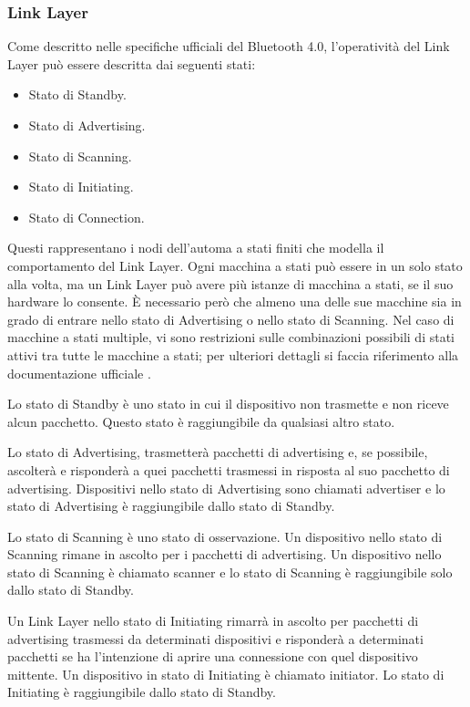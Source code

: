 \subsubsection{Link Layer}
Come descritto nelle specifiche ufficiali del Bluetooth 4.0\cite{BT-CoreSpec4.0}, l'operatività del Link Layer può essere descritta dai seguenti stati:
\begin{itemize}
	\item Stato di Standby.
	\item Stato di Advertising.
	\item Stato di Scanning.
	\item Stato di Initiating.
	\item Stato di Connection.
\end{itemize}
Questi rappresentano i nodi dell'automa a stati finiti che modella il comportamento del Link Layer. Ogni macchina a stati può essere in un solo stato alla volta, ma un Link Layer può avere più istanze di macchina a stati, se il suo hardware lo consente. È necessario però che almeno una delle sue macchine sia in grado di entrare nello stato di Advertising o nello stato di Scanning. Nel caso di macchine a stati multiple, vi sono restrizioni sulle combinazioni possibili di stati attivi tra tutte le macchine a stati; per ulteriori dettagli si faccia riferimento alla documentazione ufficiale \cite{BT-CoreSpec4.0}.\medskip

Lo stato di Standby è uno stato in cui il dispositivo non trasmette e non riceve alcun pacchetto. Questo stato è raggiungibile da qualsiasi altro stato.\medskip

Lo stato di Advertising, trasmetterà pacchetti di advertising e, se possibile, ascolterà e risponderà a quei pacchetti trasmessi in risposta al suo pacchetto di advertising. Dispositivi nello stato di Advertising sono chiamati advertiser e lo stato di Advertising è raggiungibile dallo stato di Standby.\medskip

Lo stato di Scanning è uno stato di osservazione. Un dispositivo nello stato di Scanning rimane in ascolto per i pacchetti di advertising. Un dispositivo nello stato di Scanning è chiamato scanner e lo stato di Scanning è raggiungibile solo dallo stato di Standby.\medskip

Un Link Layer nello stato di Initiating rimarrà in ascolto per pacchetti di advertising trasmessi da determinati dispositivi e risponderà a determinati pacchetti se ha l’intenzione di aprire una connessione con quel dispositivo mittente. Un dispositivo in stato di Initiating è chiamato initiator. Lo stato di Initiating è raggiungibile dallo stato di Standby.\medskip

